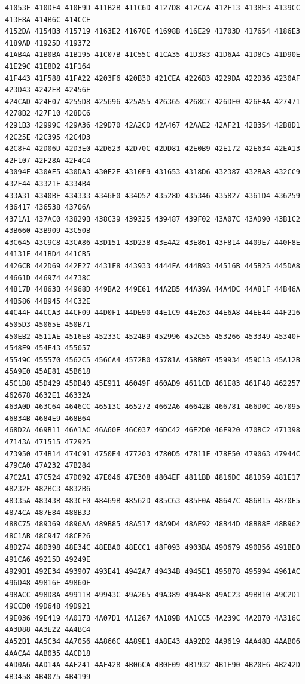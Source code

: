 \documentclass[11pt]{amsart}
\theoremstyle{remark}
\begin{document}
{\begin{verbatim}
41053F 410DF4 410E9D 411B2B 411C6D 4127D8 412C7A 412F13 4138E3 4139CC 413E8A 414B6C 414CCE
4152DA 4154B3 415719 4163E2 41670E 41698B 416E29 41703D 417654 4186E3 4189AD 41925D 419372
41AB4A 41B0BA 41B195 41C07B 41C55C 41CA35 41D383 41D6A4 41D8C5 41D90E 41E29C 41E8D2 41F164
41F443 41F588 41FA22 4203F6 420B3D 421CEA 4226B3 4229DA 422D36 4230AF 423D43 4242EB 42456E
424CAD 424F07 4255D8 425696 425A55 426365 4268C7 426DE0 426E4A 427471 4278B2 427F10 428DC6
4291B3 42999C 429A36 429D70 42A2CD 42A467 42AAE2 42AF21 42B354 42B8D1 42C25E 42C395 42C4D3
42C8F4 42D06D 42D3E0 42D623 42D70C 42DD81 42E0B9 42E172 42E634 42EA13 42F107 42F28A 42F4C4
43094F 430AE5 430DA3 430E2E 4310F9 431653 4318D6 432387 432BA8 432CC9 432F44 43321E 4334B4
433A31 4340BE 434333 4346F0 434D52 43528D 435346 435827 4361D4 436259 436417 436538 43706A
4371A1 437AC0 43829B 438C39 439325 439487 439F02 43A07C 43AD90 43B1C2 43B660 43B909 43C50B
43C645 43C9C8 43CA86 43D151 43D238 43E4A2 43E861 43F814 4409E7 440F8E 44131F 441BD4 441CB5
4426CB 442D69 442E27 4431F8 443933 4444FA 444B93 44516B 445B25 445DA8 44661D 446974 44738C
44817D 44863B 44968D 449BA2 449E61 44A2B5 44A39A 44A4DC 44A81F 44B46A 44B586 44B945 44C32E
44C44F 44CCA3 44CF09 44D0F1 44DE90 44E1C9 44E263 44E6A8 44EE44 44F216 4505D3 45065E 450B71
450EB2 4511AE 4516E8 45233C 4524B9 452996 452C55 453266 453349 45340F 4548E9 454E43 455057
45549C 455570 4562C5 456CA4 4572B0 45781A 458B07 459934 459C13 45A12B 45A9E0 45AE81 45B618
45C1B8 45D429 45DB40 45E911 46049F 460AD9 4611CD 461E83 461F48 462257 462678 4632E1 46332A
463A0D 463C64 4646CC 46513C 465272 4662A6 46642B 466781 466D0C 467095 46834B 4684E9 468B64
468D2A 469B11 46A1AC 46A60E 46C037 46DC42 46E2D0 46F920 470BC2 471398 47143A 471515 472925
473950 474B14 474C91 4750E4 477203 4780D5 47811E 478E50 479063 47944C 479CA0 47A232 47B284
47C2A1 47C524 47D092 47E046 47E308 4804EF 4811BD 4816DC 481D59 481E17 48232F 482BC3 4832B6
48335A 48343B 483CF0 48469B 48562D 485C63 485F0A 48647C 486B15 4870E5 4874CA 487E84 488B33
488C75 489369 4896AA 489B85 48A517 48A9D4 48AE92 48B44D 48B88E 48B962 48C1AB 48C947 48CE26
48D274 48D398 48E34C 48EBA0 48ECC1 48F093 4903BA 490679 490B56 491BE0 491CA6 49215D 49249E
4929B1 492E34 493907 493E41 4942A7 49434B 4945E1 495878 495994 4961AC 496D48 49816E 49860F
498ACC 498D8A 49911B 49943C 49A265 49A389 49A4E8 49AC23 49BB10 49C2D1 49CCB0 49D648 49D921
49E036 49E419 4A017B 4A07D1 4A1267 4A189B 4A1CC5 4A239C 4A2B70 4A316C 4A3D88 4A3E22 4A4BC4
4A52B1 4A5C34 4A7056 4A866C 4A89E1 4A8E43 4A92D2 4A9619 4AA48B 4AAB06 4AACA4 4AB035 4ACD18
4AD0A6 4AD14A 4AF241 4AF428 4B06CA 4B0F09 4B1932 4B1E90 4B20E6 4B242D 4B3458 4B4075 4B4199

\end{verbatim}}
\end{document}
